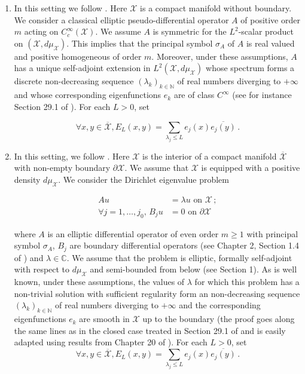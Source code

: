 \documentclass[10pt,twoside]{article}
\newcommand{\C}{\mathbb{C}}
\newcommand{\N}{\mathbb{N}}
\newcommand{\man}{\mathcal{X}}
\numberwithin{theorem}{section}
\begin{document}
\begin{enumerate}
\item
In this setting we follow \cite{ho68}. Here $\man$ is a compact manifold without boundary. We consider a classical elliptic pseudo-differential operator $A$ of positive order $m$ acting on $C^\infty_c(\man)$. We assume $A$ is symmetric for the $L^2$-scalar product on $(\man,d\mu_\man)$. This implies that the principal symbol $\sigma_A$ of $A$ is real valued and positive homogeneous of order $m$. Moreover, under these assumptions, $A$ has a unique self-adjoint extension in $L^2(\man,d\mu_\man)$ whose spectrum forms a discrete non-decreasing sequence $(\lambda_k)_{k\in\N}$ of real numbers diverging to $+\infty$ and whose corresponding eigenfunctions $e_k$ are of class $C^\infty$ (see for instance Section 29.1 of \cite{ho_apdo4}). For each $L>0$, set

\[
\forall x,y\in\overline{\man}, E_L(x,y)=\sum_{\lambda_j\leq L}e_j(x)\overline{e_j(y)}\, .
\]

\item
In this setting, we follow \cite{vas83}. Here $\man$ is the interior of a compact manifold $\overline{\man}$ with non-empty boundary $\partial\man$. We assume that $\man$ is equipped with a positive density $d\mu_\man$. We consider the Dirichlet eigenvalue problem

\begin{align*}
Au&=\lambda u\text{ on }\man\, ;\\
\forall j=1,\dots,j_0,\, B_ju&=0\text{ on }\partial\man
\end{align*}

where $A$ is an elliptic differential operator of even order $m\geq 1$ with principal symbol $\sigma_A$, $B_j$ are boundary differential operators (see Chapter 2, Section 1.4 of \cite{lions_magenes_1}) and $\lambda\in\C$. We assume that the problem is elliptic, formally self-adjoint with respect to $d\mu_\man$ and semi-bounded from below (see \cite{vas83} Section 1). As is well known, under these assumptions, the values of $\lambda$ for which this problem has a non-trivial solution with sufficient regularity form an non-decreasing sequence $(\lambda_k)_{k\in\N}$ of real numbers diverging to $+\infty$ and the corresponding eigenfunctions $e_k$ are smooth in $\man$ up to the boundary (the proof goes along the same lines as in the closed case treated in Section 29.1 of \cite{ho_apdo4} and is easily adapted using results from Chapter 20 of \cite{ho_apdo3}). For each $L>0$, set
\[
\forall x,y\in\overline{\man}, E_L(x,y)=\sum_{\lambda_j\leq L}e_j(x)\overline{e_j(y)}\, .
\]
\end{enumerate}
\end{document}

